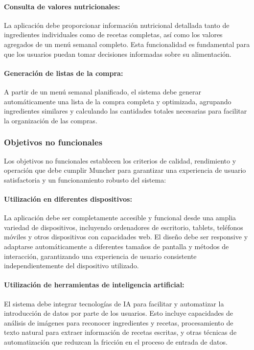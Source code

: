 \paragraph*{Consulta de valores nutricionales:}
La aplicación debe proporcionar información nutricional detallada tanto de ingredientes individuales como de recetas completas, así como los valores agregados de un menú semanal completo. Esta funcionalidad es fundamental para que los usuarios puedan tomar decisiones informadas sobre su alimentación.

\paragraph*{Generación de listas de la compra:}
A partir de un menú semanal planificado, el sistema debe generar automáticamente una lista de la compra completa y optimizada, agrupando ingredientes similares y calculando las cantidades totales necesarias para facilitar la organización de las compras.

\subsubsection*{Objetivos no funcionales}

Los objetivos no funcionales establecen los criterios de calidad, rendimiento y operación que debe cumplir Muncher para garantizar una experiencia de usuario satisfactoria y un funcionamiento robusto del sistema:

\paragraph{Utilización en diferentes dispositivos:}
La aplicación debe ser completamente accesible y funcional desde una amplia variedad de dispositivos, incluyendo ordenadores de escritorio, tablets, teléfonos móviles y otros dispositivos con capacidades web. El diseño debe ser responsive y adaptarse automáticamente a diferentes tamaños de pantalla y métodos de interacción, garantizando una experiencia de usuario consistente independientemente del dispositivo utilizado.

\paragraph{Utilización de herramientas de inteligencia artificial:}
El sistema debe integrar tecnologías de IA para facilitar y automatizar la introducción de datos por parte de los usuarios. Esto incluye capacidades de análisis de imágenes para reconocer ingredientes y recetas, procesamiento de texto natural para extraer información de recetas escritas, y otras técnicas de automatización que reduzcan la fricción en el proceso de entrada de datos.

